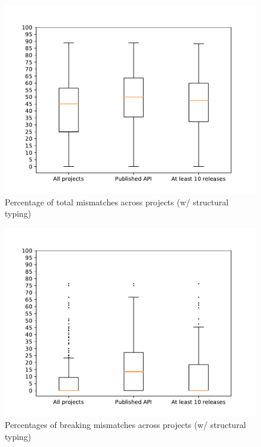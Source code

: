 \documentclass{l4proj}
\begin{document}
\begin{appendices}
\begin{figure}[]
\centering
\caption{Percentage of total mismatches across projects (w/ structural
typing)}
\label{StrBoxplotsMismatches}
\includegraphics[height=0.4\textheight]{images/evaluation/str_boxplots_mismatches}
\end{figure}

\begin{figure}[]
\centering
\caption{Percentages of breaking mismatches across projects (w/
structural typing)}
\label{StrBoxplotsBreaking}
\includegraphics[height=0.4\textheight]{images/evaluation/str_boxplots_breaking}
\end{figure}


\end{appendices}
\end{document}
